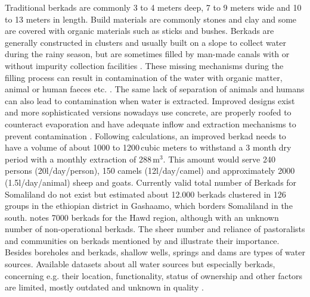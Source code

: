 Traditional berkads are commonly 3 to 4 meters deep, 7 to 9 meters wide and 10 to 13 meters in length. Build materials are commonly stones and clay and some are covered with organic materials such as sticks and bushes. Berkads are generally constructed in clusters and usually built on a slope to collect water during the rainy season, but are sometimes filled by man-made canals with or without impurity collection facilities \autocite{walkerChangingPastoralismEthiopian1998}. These missing mechanisms during the filling process can result in contamination of the water with organic matter, animal or human faeces etc. \autocite{mercycorpsIMPROVEDBERKADDESIGNS2017}. The same lack of separation of animals and humans can also lead to contamination when water is extracted. Improved designs exist and more sophisticated versions nowadays use concrete, are properly roofed to counteract evaporation and have adequate inflow and extraction mechanisms to prevent contamination \autocite{mercycorpsIMPROVEDBERKADDESIGNS2017, petrucciLandscapeLandformsNorthern2022}. Following \autocite{mercycorpsIMPROVEDBERKADDESIGNS2017} calculations, an improved berkad needs to have a volume of about 1000 to 1200\,cubic meters to  withstand a 3 month dry period with a monthly extraction of 288\,m$^3$. This amount would serve 240 persons (20l/day/person), 150 camels (12l/day/camel) and approximately 2000 (1.5l/day/animal) sheep and goats. Currently valid total number of Berkads for Somaliland do not exist but \autocite{walkerChangingPastoralismEthiopian1998} estimated about 12.000 berkads clustered in 126 groups in the ethiopian district in Gashaamo, which borders Somaliland in the south. \autocite{birchWeUsedSing2008} notes 7000 berkads for the Hawd region, although with an unknown number of non-operational berkads. The sheer number and reliance of pastoralists and communities on berkads mentioned by \autocite{walkerChangingPastoralismEthiopian1998} and \autocite{birchSomalilandSomaliRegion2008} illustrate their importance. Besides boreholes and berkads, shallow wells, springs and dams are types of water sources. Available datasets about all water sources but especially berkads, concerning e.g. their location, functionality, status of ownership and other factors are limited, mostly outdated and unknown in quality \autocite{FAOSWALIMSomalia}. %


